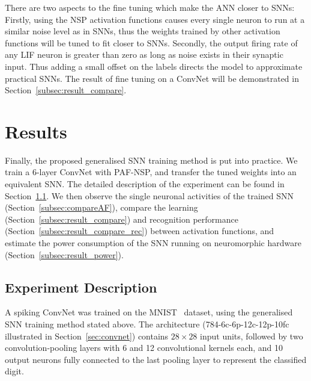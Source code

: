 	
	There are two aspects to the fine tuning which make the ANN closer to SNNs:
	Firstly, using the NSP activation functions causes every single neuron to run at a similar noise level as in SNNs, thus the weights trained by other activation functions will be tuned to fit closer to SNNs.
	Secondly, the output firing rate of any LIF neuron is greater than zero as long as noise exists in their synaptic input.
	Thus adding a small offset on the labels directs the model to approximate practical SNNs. 
	The result of fine tuning on a ConvNet will be demonstrated in Section~\ref{subsec:result_compare}.

\section{Results}
\label{sec:iconipResult}
	Finally, the proposed generalised SNN training method is put into practice.
	We train a 6-layer ConvNet with PAF-NSP, and transfer the tuned weights into an equivalent SNN.
	The detailed description of the experiment can be found in Section~\ref{subsec:expDesr}.
	We then observe the single neuronal activities of the trained SNN (Section~\ref{subsec:compareAF}), compare the learning (Section~\ref{subsec:result_compare}) and recognition performance (Section~\ref{subsec:result_compare_rec}) between activation functions, and estimate the power consumption of the SNN running on neuromorphic hardware (Section~\ref{subsec:result_power}).  

	\subsection{Experiment Description}
	\label{subsec:expDesr}
	A spiking ConvNet was trained on the MNIST~\citep{lecun1998gradient} dataset, 
	using the generalised SNN training method stated above.
	The architecture (784-6c-6p-12c-12p-10fc illustrated in Section~\ref{sec:convnet}) contains $28\times28$ input units, followed by two convolution-pooling layers with 6 and 12 convolutional kernels each, and 10 output neurons fully connected to the last pooling layer to represent the classified digit.

